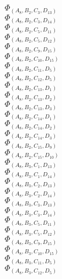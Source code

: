 \documentclass[14pt]{article}
\begin{document}
    $\Phi_{({A}_{8}, {B}_{2}, {C}_{3}, {D}_{13})}$ \\ 
    $\Phi_{({A}_{8}, {B}_{2}, {C}_{3}, {D}_{14})}$ \\ 
    $\Phi_{({A}_{8}, {B}_{2}, {C}_{5}, {D}_{11})}$ \\ 
    $\Phi_{({A}_{8}, {B}_{2}, {C}_{5}, {D}_{12})}$ \\ 
    $\Phi_{({A}_{8}, {B}_{2}, {C}_{9}, {D}_{15})}$ \\ 
    $\Phi_{({A}_{8}, {B}_{2}, {C}_{10}, {D}_{15})}$ \\ 
    $\Phi_{({A}_{8}, {B}_{2}, {C}_{11}, {D}_{5})}$ \\ 
    $\Phi_{({A}_{8}, {B}_{2}, {C}_{12}, {D}_{5})}$ \\ 
    $\Phi_{({A}_{8}, {B}_{2}, {C}_{13}, {D}_{1})}$ \\ 
    $\Phi_{({A}_{8}, {B}_{2}, {C}_{13}, {D}_{2})}$ \\ 
    $\Phi_{({A}_{8}, {B}_{2}, {C}_{13}, {D}_{3})}$ \\ 
    $\Phi_{({A}_{8}, {B}_{2}, {C}_{14}, {D}_{1})}$ \\ 
    $\Phi_{({A}_{8}, {B}_{2}, {C}_{14}, {D}_{2})}$ \\ 
    $\Phi_{({A}_{8}, {B}_{2}, {C}_{14}, {D}_{3})}$ \\ 
    $\Phi_{({A}_{8}, {B}_{2}, {C}_{15}, {D}_{9})}$ \\ 
    $\Phi_{({A}_{8}, {B}_{2}, {C}_{15}, {D}_{10})}$ \\ 
    $\Phi_{({A}_{8}, {B}_{3}, {C}_{1}, {D}_{13})}$ \\ 
    $\Phi_{({A}_{8}, {B}_{3}, {C}_{1}, {D}_{14})}$ \\ 
    $\Phi_{({A}_{8}, {B}_{3}, {C}_{2}, {D}_{13})}$ \\ 
    $\Phi_{({A}_{8}, {B}_{3}, {C}_{2}, {D}_{14})}$ \\ 
    $\Phi_{({A}_{8}, {B}_{3}, {C}_{3}, {D}_{13})}$ \\ 
    $\Phi_{({A}_{8}, {B}_{3}, {C}_{3}, {D}_{14})}$ \\ 
    $\Phi_{({A}_{8}, {B}_{3}, {C}_{5}, {D}_{11})}$ \\ 
    $\Phi_{({A}_{8}, {B}_{3}, {C}_{5}, {D}_{12})}$ \\ 
    $\Phi_{({A}_{8}, {B}_{3}, {C}_{9}, {D}_{15})}$ \\ 
    $\Phi_{({A}_{8}, {B}_{3}, {C}_{10}, {D}_{15})}$ \\ 
    $\Phi_{({A}_{8}, {B}_{3}, {C}_{11}, {D}_{5})}$ \\ 
    $\Phi_{({A}_{8}, {B}_{3}, {C}_{12}, {D}_{5})}$ \\ 
\end{document}

